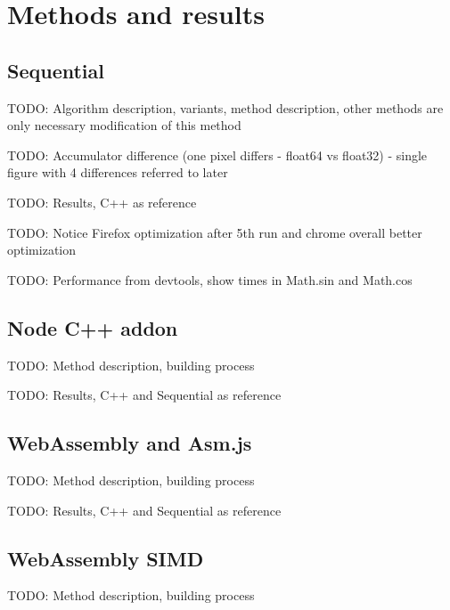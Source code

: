 \section{Methods and results}\label{sec:methods_results}

\subsection{Sequential}

TODO: Algorithm description, variants, method description, other methods are only necessary modification of this method

TODO: Accumulator difference (one pixel differs - float64 vs float32) - single figure with 4 differences referred to later

TODO: Results, C++ as reference

TODO: Notice Firefox optimization after 5th run and chrome overall better optimization



TODO: Performance from devtools, show times in Math.sin and Math.cos



\subsection{Node C++ addon}

TODO: Method description, building process

TODO: Results, C++ and Sequential as reference



\subsection{WebAssembly and Asm.js}

TODO: Method description, building process

TODO: Results, C++ and Sequential as reference





\subsection{WebAssembly SIMD}

TODO: Method description, building process



